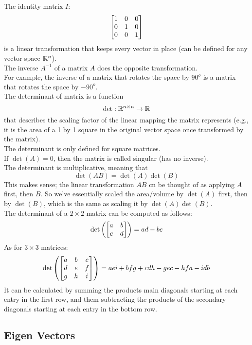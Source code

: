 \documentclass[12pt]{article}
\begin{document}
    The identity matrix $I$:
    \[ \begin{bmatrix} 1 & 0 & 0 \\ 0 & 1 & 0 \\ 0 & 0 & 1 \end{bmatrix} \]
    is a linear transformation that keeps
    every vector in place
    (can be defined for any vector space $\mathbb{R}^n$). \\

    The inverse $A^{-1}$ of a matrix $A$
    does the opposite transformation. \\
    For example, the inverse of
    a matrix that rotates the space by $90^o$
    is a matrix that rotates the space by $-90^o$. \\

    The determinant of matrix is a function
    \[ \det: \mathbb{R}^{n \times n} \to \mathbb{R} \]
    that describes the scaling factor of the
    linear mapping the matrix represents
    (e.g., it is the area of a 1 by 1 square
    in the original vector space once
    transformed by the matrix). \\

    The determinant is only defined for square matrices. \\
    
    If $\det(A) = 0$,
    then the matrix is called singular
    (has no inverse). \\

    The determinant is multiplicative,
    meaning that
    \[ \det(AB) = \det(A)\det(B) \]
    This makes sense;
    the linear transformation $AB$
    cn be thought of as applying $A$
    first, then $B$.
    So we've essentially scaled the area/volume
    by $\det(A)$ first, then by $\det(B)$,
    which is the same as scaling it by $\det(A)\det(B)$. \\

    The determinant of a $2 \times 2$ matrix
    can be computed as follows:
    \[ \det\left( \begin{bmatrix} a & b \\ c & d \end{bmatrix} \right) 
    = ad - bc \]
    As for $3 \times 3$ matrices:
     \[ \det\left( \begin{bmatrix} a & b & c \\ d & e & f \\ g & h & i \end{bmatrix} \right) 
    = aei + bfg + cdh - gec - hfa - idb \]
    It can be calculated by summing
    the products main diagonals starting at each entry in
    the first row,
    and them subtracting the products
    of the secondary diagonals starting at each
    entry in the bottom row. \\

    \newpage

    \subsection*{Eigen Vectors}
\end{document}
